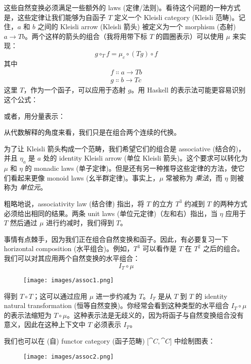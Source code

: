 这些自然变换必须满足一些额外的 laws (定律/法则)。看待这个问题的一种方式是，这些定律让我们能够为自函子 $T$ 定义一个 Kleisli category (Kleisli 范畴)。记住，$a$ 和 $b$ 之间的 Kleisli arrow (Kleisli 箭头) 被定义为一个 morphism (态射) $a \to T b$。两个这样的箭头的组合（我将用带下标 $T$ 的圆圈表示）可以使用 $\mu$ 来实现：
\[g \circ_T f = \mu_c \circ (T g) \circ f\]
其中
\begin{gather*}
  f \Colon a \to T b \\
  g \Colon b \to T c
\end{gather*}
这里 $T$，作为一个函子，可以应用于态射 $g$。用 Haskell 的表示法可能更容易识别这个公式：

或者，用分量表示：

从代数解释的角度来看，我们只是在组合两个连续的代换。

为了让 Kleisli 箭头构成一个范畴，我们希望它们的组合是 associative (结合的)，并且 $\eta_a$ 是 $a$ 处的 identity Kleisli arrow (单位 Kleisli 箭头)。这个要求可以转化为 $\mu$ 和 $\eta$ 的 monadic laws (单子定律)。但是还有另一种推导这些定律的方法，使它们看起来更像 monoid laws (幺半群定律)。事实上，$\mu$ 常被称为 \emph{乘法}，而 $\eta$ 则被称为 \emph{单位元}。

粗略地说，associativity law (结合律) 指出，将 $T$ 的立方 $T^3$ 约减到 $T$ 的两种方式必须给出相同的结果。两条 unit laws (单位元定律)（左和右）指出，当 $\eta$ 应用于 $T$ 然后通过 $\mu$ 进行约减时，我们得到 $T$。

事情有点棘手，因为我们正在组合自然变换和函子。因此，有必要复习一下 horizontal composition (水平组合)。例如，$T^3$ 可以看作是 $T$ 在 $T^2$ 之后的组合。我们可以对其应用两个自然变换的水平组合：
\[I_T \circ \mu\]

\begin{figure}[H]
  \centering
  \texttt{[image: images/assoc1.png]}
\end{figure}

\noindent
得到 $T \circ T$；这可以通过应用 $\mu$ 进一步约减为 $T$。$I_T$ 是从 $T$ 到 $T$ 的 identity natural transformation (恒等自然变换)。你经常会看到这种类型的水平组合 $I_T \circ \mu$ 的表示法缩短为 $T \circ \mu$。这种表示法是无歧义的，因为将函子与自然变换组合没有意义，因此在这种上下文中 $T$ 必须表示 $I_T$。

\noindent
我们也可以在 (自) functor category (函子范畴) ${[}\cat{C}, \cat{C}{]}$ 中绘制图表：

\begin{figure}[H]
  \centering
  \texttt{[image: images/assoc2.png]}
\end{figure}

